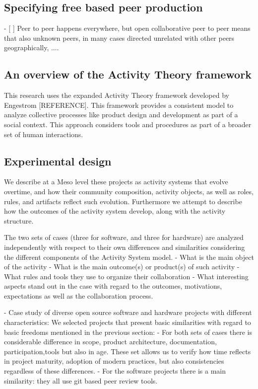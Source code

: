 \documentclass{ICED-Paper}%
\begin{document}
\subsection{Specifying free based peer production}
- [ ] Peer to peer happens everywhere, but open collaborative peer to peer means that also unknown peers, in many cases directed unrelated with other peers geographically, ....
\subsection{An overview of  the Activity Theory framework}
This research uses the expanded Activity Theory framework developed by Engestrom [REFERENCE]. This framework provides a consistent model to analyze collective processes like product design and development as part of a social context. This approach considers tools and procedures as part of a broader set of human interactions.
\subsection{Experimental design}

We describe at a Meso level these projects as activity  systems that evolve overtime, and how their community composition, activity objects, as well as roles, rules, and artifacts reflect such evolution. Furthermore we attempt to describe how the outcomes of the activity system develop, along with the activity structure.

The two sets of cases (three for software, and three for hardware) are analyzed independently with respect to their own differences and similarities considering the different components of the Activity System model.
- What is the main object of the activity
- What is the main outcome(s) or product(s) of such activity
- What rules and tools they use to organize their collaboration
- What interesting aspects stand out in the case with regard to the outcomes, motivations, expectations as well as the collaboration process.



- Case study of diverse open source software and hardware projects with different characteristics:
We selected projects that present basic similarities with regard to basic freedoms mentioned in the previous section:
- For both sets of cases there is considerable difference in scope, product architecture, documentation, participation,tools but also in age. These set allows us to verify how time reflects in project maturity, adoption of modern practices, but also consistencies regardless of these differences.
- For the software projects there is a main similarity: they all use git based peer review tools.
\end{document}
